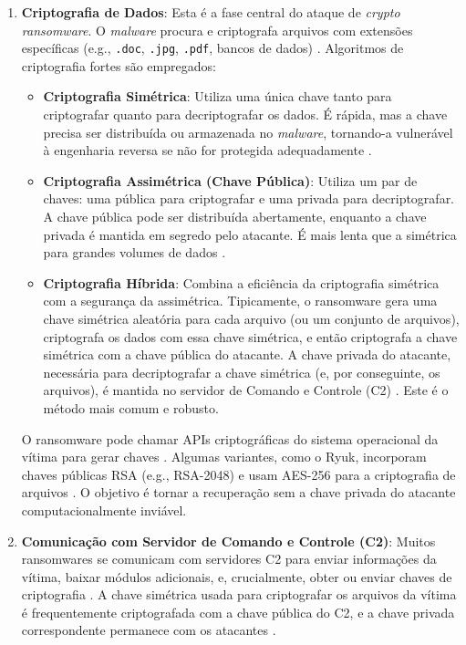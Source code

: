 \begin{enumerate}
    \item \textbf{Criptografia de Dados}: Esta é a fase central do ataque de \textit{crypto ransomware}. 
    O \textit{malware} procura e criptografa arquivos com extensões específicas (e.g., \texttt{.doc}, \texttt{.jpg}, 
    \texttt{.pdf}, bancos de dados) \cite{Tanni2022RedAlert}. Algoritmos de criptografia fortes são empregados:
    \begin{itemize}
        \item \textbf{Criptografia Simétrica}: Utiliza uma única chave tanto para criptografar quanto para decriptografar os dados. 
        É rápida, mas a chave precisa ser distribuída ou armazenada no \textit{malware}, tornando-a vulnerável à engenharia reversa 
        se não for protegida adequadamente \cite{Tanni2022RedAlert}.
        \item \textbf{Criptografia Assimétrica (Chave Pública)}: Utiliza um par de chaves: uma pública para criptografar e 
        uma privada para decriptografar. A chave pública pode ser distribuída abertamente, enquanto a chave privada é mantida em 
        segredo pelo atacante. É mais lenta que a simétrica para grandes volumes de dados \cite{Tanni2022RedAlert}.
        \item \textbf{Criptografia Híbrida}: Combina a eficiência da criptografia simétrica com a segurança da assimétrica. 
        Tipicamente, o ransomware gera uma chave simétrica aleatória para cada arquivo (ou um conjunto de arquivos), criptografa 
        os dados com essa chave simétrica, e então criptografa a chave simétrica com a chave pública do atacante. A chave privada 
        do atacante, necessária para decriptografar a chave simétrica (e, por conseguinte, os arquivos), é mantida no servidor de 
        Comando e Controle (C2) \cite{Tanni2022RedAlert}. Este é o método mais comum e robusto.
    \end{itemize}
    O ransomware pode chamar APIs criptográficas do sistema operacional da vítima para gerar chaves \cite{Tanni2022RedAlert}. 
    Algumas variantes, como o Ryuk, incorporam chaves públicas RSA (e.g., RSA-2048) e usam AES-256 para a criptografia de arquivos 
    \cite{CrowdStrikeRyukAnalysis}. O objetivo é tornar a recuperação sem a chave privada do atacante computacionalmente inviável.

    \item \textbf{Comunicação com Servidor de Comando e Controle (C2)}: Muitos ransomwares se comunicam com servidores C2 
    para enviar informações da vítima, baixar módulos adicionais, e, crucialmente, obter ou enviar chaves de criptografia 
    \cite{Tanni2022RedAlert}. A chave simétrica usada para criptografar os arquivos da vítima é frequentemente criptografada 
    com a chave pública do C2, e a chave privada correspondente permanece com os atacantes \cite{Tanni2022RedAlert}.


\end{enumerate}
